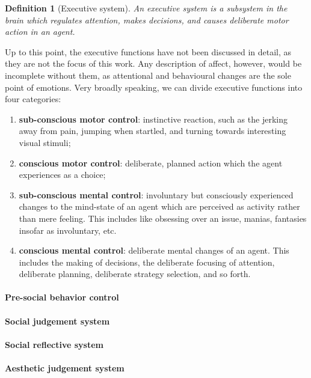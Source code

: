\documentclass[]{scrartcl}
\theoremstyle{break}
\newtheorem{definition}{Definition}
\begin{document}
\begin{definition}[Executive system]
An executive system is a subsystem in the brain which regulates attention, makes decisions, and causes deliberate motor action in an agent.
\end{definition}

Up to this point, the executive functions have not been discussed in detail, as they are not the focus of this work. Any description of affect, however, would be incomplete without them, as attentional and behavioural changes are the sole point of emotions. Very broadly speaking, we can divide executive functions into four categories:

\begin{enumerate}
	\item \textbf{sub-conscious motor control}: instinctive reaction, such as the jerking away from pain, jumping when startled, and turning towards interesting visual stimuli;
	\item \textbf{conscious motor control}: deliberate, planned action which the agent experiences as a choice;
	\item \textbf{sub-conscious mental control}: involuntary but consciously experienced changes to the mind-state of an agent which are perceived as activity rather than mere feeling. This includes like obsessing over an issue, manias, fantasies insofar as involuntary, etc.
	\item \textbf{conscious mental control}: deliberate mental changes of an agent. This includes the making of decisions, the deliberate focusing of attention, deliberate planning, deliberate strategy selection, and so forth.
\end{enumerate}

\paragraph{Pre-social behavior control} 

\paragraph{Social judgement system}

\paragraph{Social reflective system}

\paragraph{Aesthetic judgement system}
\end{document}

